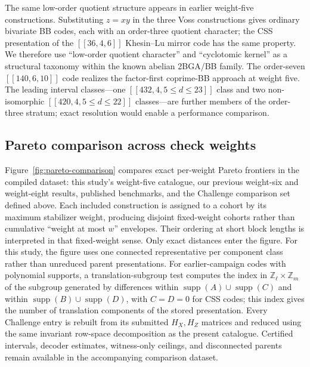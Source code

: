 \documentclass[aps,prx,twocolumn,superscriptaddress,nofootinbib,floatfix]{revtex4-2}
\newcommand{\code}[1]{\ensuremath{\left[\!\left[#1\right]\!\right]}}
\begin{document}
The same low-order quotient structure appears in earlier weight-five
constructions.  Substituting $z=xy$ in the three Voss constructions gives
ordinary bivariate BB codes, each with an order-three quotient character; the
CSS presentation of the $\code{36,4,6}$ Khesin--Lu mirror code has the same
property.  We therefore use ``low-order quotient character'' and ``cyclotomic
kernel'' as a structural taxonomy within the known abelian 2BGA/BB family.
The order-seven $\code{140,6,10}$ code realizes the factor-first coprime-BB
approach at weight five.  The leading interval classes---one
$\code{432,4,5\leq d\leq23}$ class and two non-isomorphic
$\code{420,4,5\leq d\leq22}$ classes---are further members of the order-three
stratum; exact resolution would enable a performance comparison.

\subsection{Pareto comparison across check weights}
\label{sec:pareto-comparison}

Figure~\ref{fig:pareto-comparison} compares exact per-weight Pareto frontiers in
the compiled dataset: this study's weight-five catalogue, our previous
weight-six and weight-eight results, published benchmarks, and the Challenge
comparison set defined above.  Each included construction is assigned to a
cohort by its maximum stabilizer weight, producing disjoint fixed-weight cohorts rather than
cumulative ``weight at most $w$'' envelopes.  Their ordering at short block
lengths is interpreted in that fixed-weight sense.  Only exact distances enter
the figure.  For this
study, the figure uses one connected representative per component class
rather than unreduced parent presentations.  For earlier-campaign codes with
polynomial supports, a translation-subgroup test computes the index in
$\mathbb{Z}_{\ell}\times\mathbb{Z}_m$ of the subgroup generated by differences
within $\operatorname{supp}(A)\cup\operatorname{supp}(C)$ and within
$\operatorname{supp}(B)\cup\operatorname{supp}(D)$, with $C=D=0$ for CSS
codes; this index gives the number of translation components of the stored
presentation.  Every Challenge entry is rebuilt from its submitted $H_X,H_Z$ matrices
and reduced using the same invariant row-space decomposition as the present
catalogue.  Certified intervals, decoder estimates, witness-only ceilings, and
disconnected parents remain available in the accompanying comparison dataset.
\end{document}
